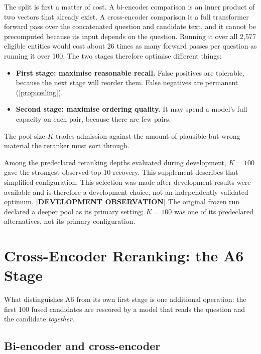 \documentclass[11pt,a4paper]{article}
\newcommand{\cref}[1]{\autoref{#1}}
\theoremstyle{remark}
\newcommand{\vtag}[2]{{\sffamily\scriptsize\bfseries\textcolor{#1}{[#2]}}}
\newcommand{\Otag}{\vtag{warnline}{DEVELOPMENT OBSERVATION}}
\begin{document}
The split is first a matter of cost. A bi-encoder comparison is an inner product of two
vectors that already exist. A cross-encoder comparison is a full transformer forward pass
over the concatenated question and candidate text, and it cannot be precomputed because
its input depends on the question. Running it over all 2{,}577 eligible entities would
cost about 26 times as many forward passes per question as running it over 100. The two
stages therefore optimise different things:

\begin{itemize}
  \item \textbf{First stage: maximise reasonable recall.} False positives are tolerable,
        because the next stage will reorder them. False negatives are permanent
        (\cref{prop:ceiling}).
  \item \textbf{Second stage: maximise ordering quality.} It may spend a model's full
        capacity on each pair, because there are few pairs.
\end{itemize}

The pool size $K$ trades admission against the amount of plausible-but-wrong material the
reranker must sort through.

\begin{cautionbox}[How $K=100$ was chosen]
\label{sec:k-status}
Among the predeclared reranking depths evaluated during development, $K=100$ gave the
strongest observed top-10 recovery. This supplement describes that simplified
configuration. This selection was made after development results were available and is
therefore a development choice, not an independently validated optimum. \Otag{} The
original frozen run declared a deeper pool as its primary setting; $K=100$ was one of
its predeclared alternatives, not its primary configuration.
\end{cautionbox}

\section{Cross-Encoder Reranking: the A6 Stage}
\label{sec:crossencoder}

What distinguishes A6 from its own first stage is one additional operation: the first 100
fused candidates are rescored by a model that reads the question and the candidate
\emph{together}.

\subsection{Bi-encoder and cross-encoder}
\end{document}
